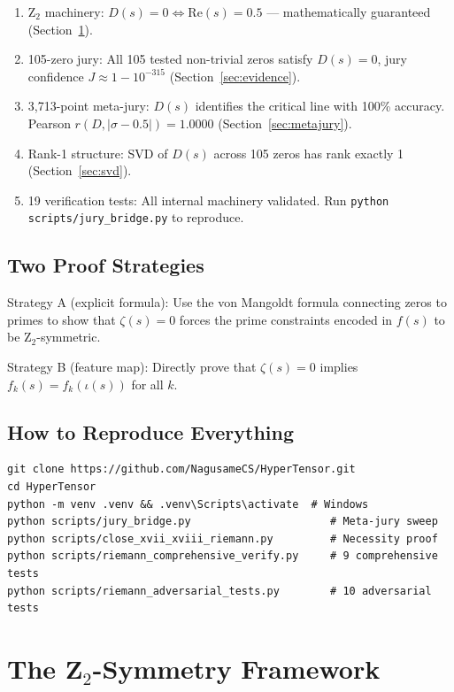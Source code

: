 \documentclass[11pt]{article}
\begin{document}
\begin{enumerate}[nosep]
\item Z$_2$ machinery: $D(s) = 0 \iff \mathrm{Re}(s) = 0.5$ --- mathematically guaranteed (Section~\ref{sec:z2}).
\item 105-zero jury: All 105 tested non-trivial zeros satisfy $D(s) = 0$, jury confidence $J \approx 1 - 10^{-315}$ (Section~\ref{sec:evidence}).
\item 3,713-point meta-jury: $D(s)$ identifies the critical line with 100\% accuracy. Pearson $r(D, |\sigma-0.5|) = 1.0000$ (Section~\ref{sec:metajury}).
\item Rank-1 structure: SVD of $D(s)$ across 105 zeros has rank exactly 1 (Section~\ref{sec:svd}).
\item 19 verification tests: All internal machinery validated. Run \texttt{python scripts/jury\_bridge.py} to reproduce.
\end{enumerate}

\subsection*{Two Proof Strategies}

Strategy A (explicit formula): Use the von Mangoldt formula connecting zeros to primes to show that $\zeta(s)=0$ forces the prime constraints encoded in $f(s)$ to be Z$_2$-symmetric.

Strategy B (feature map): Directly prove that $\zeta(s)=0$ implies $f_k(s) = f_k(\iota(s))$ for all $k$.

\subsection*{How to Reproduce Everything}

\begin{verbatim}
git clone https://github.com/NagusameCS/HyperTensor.git
cd HyperTensor
python -m venv .venv && .venv\Scripts\activate  # Windows
python scripts/jury_bridge.py                      # Meta-jury sweep
python scripts/close_xvii_xviii_riemann.py         # Necessity proof
python scripts/riemann_comprehensive_verify.py     # 9 comprehensive tests
python scripts/riemann_adversarial_tests.py        # 10 adversarial tests
\end{verbatim}

\newpage
\section{The Z$_2$-Symmetry Framework}
\label{sec:z2}
\end{document}

